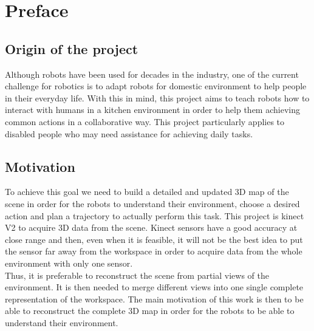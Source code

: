 
\chapter*{Preface}


\section*{Origin of the project}

Although robots have been used for decades in the industry, one of the current challenge for robotics is to adapt robots for domestic environment to help people in their everyday life. With this in mind, this project aims to teach robots how to interact with humans in a kitchen environment in order to help them achieving common actions in a collaborative way. This project particularly applies to disabled people who may need assistance for achieving daily tasks.   

\section*{Motivation}

To achieve this goal we need to build a detailed and updated 3D map of the scene in order for the robots to understand their environment, choose a desired action and plan a trajectory to actually perform this task. This project is kinect V2 to acquire 3D data from the scene. Kinect sensors have a good accuracy at close range and then, even when it is feasible, it will not be the best idea to put the sensor far away from the workspace in order to acquire data from the whole environment with only one sensor. \\
Thus, it is preferable to reconstruct the scene from partial views of the environment. It is then needed to merge different views into one single complete representation of the workspace. The main motivation of this work is then to be able to reconstruct the complete 3D map in order for the robots to be able to understand their environment.

